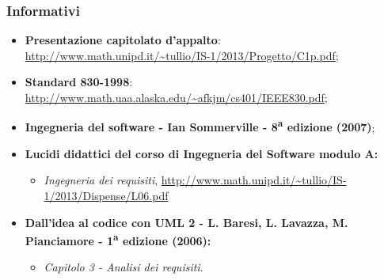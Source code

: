 	
	\subsubsection{Informativi}
		\begin{itemize}
			\item \textbf{Presentazione capitolato d'appalto}: \url{http://www.math.unipd.it/~tullio/IS-1/2013/Progetto/C1p.pdf};
			\item \textbf{Standard 830-1998}: \url{http://www.math.uaa.alaska.edu/~afkjm/cs401/IEEE830.pdf}; 
			\item \textbf{Ingegneria del software - Ian Sommerville - 8\textsuperscript{a} edizione (2007)};
			\item \textbf{Lucidi didattici del corso di Ingegneria del Software modulo A:}
			\begin{itemize}
				\item \textit{Ingegneria dei requisiti}, \url{http://www.math.unipd.it/~tullio/IS-1/2013/Dispense/L06.pdf}
			\end{itemize}
			\item \textbf{Dall'idea al codice con UML 2 - L. Baresi, L. Lavazza, M. Pianciamore - 1\textsuperscript{a} edizione (2006):}
			\begin{itemize}			
				\item \textit{Capitolo 3 - Analisi dei requisiti}.			
			\end{itemize}
		\end{itemize}
		
